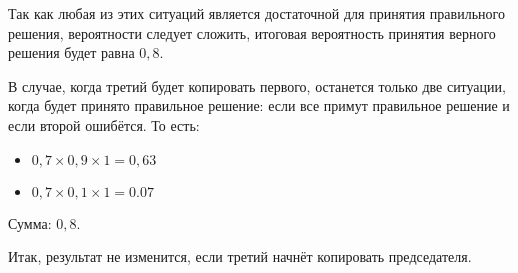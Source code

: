 \documentclass[a4paper,10pt]{article}
\begin{document}
Так как любая из этих ситуаций является достаточной для принятия правильного решения, вероятности следует сложить, итоговая вероятность принятия верного решения будет равна $0,8$.

В случае, когда третий будет копировать первого, останется только две ситуации, когда будет принято правильное решение: если все примут правильное решение и если второй ошибётся. То есть:
\begin{itemize}
 \item $0,7 \times 0,9 \times 1 = 0,63$
 \item $0,7 \times 0,1 \times 1 = 0.07$
\end{itemize}

Сумма: $0,8$.

Итак, результат не изменится, если третий начнёт копировать председателя.
\end{document}
